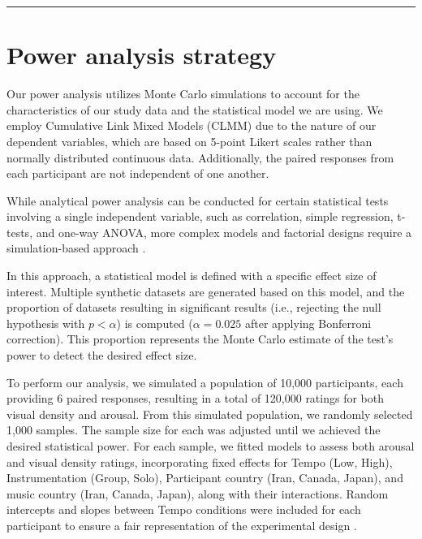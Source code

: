 \documentclass[
  bookmarksnumbered]{article}
\begin{document}
\begin{center}\rule{0.5\linewidth}{0.5pt}\end{center}

\hypertarget{power-analysis-strategy}{%
\section{Power analysis strategy}\label{power-analysis-strategy}}

Our power analysis utilizes Monte Carlo simulations to account for the characteristics of our study data and the statistical model we are using. We employ Cumulative Link Mixed Models (CLMM) due to the nature of our dependent variables, which are based on 5-point Likert scales rather than normally distributed continuous data. Additionally, the paired responses from each participant are not independent of one another.

While analytical power analysis can be conducted for certain statistical tests involving a single independent variable, such as correlation, simple regression, t-tests, and one-way ANOVA, more complex models and factorial designs require a simulation-based approach \autocite[e.g.,][]{lakensSimulationBasedPowerAnalysis2021}.

In this approach, a statistical model is defined with a specific effect size of interest. Multiple synthetic datasets are generated based on this model, and the proportion of datasets resulting in significant results (i.e., rejecting the null hypothesis with \(p < \alpha\)) is computed (\(\alpha = 0.025\) after applying Bonferroni correction). This proportion represents the Monte Carlo estimate of the test's power to detect the desired effect size.

To perform our analysis, we simulated a population of 10,000 participants, each providing 6 paired responses, resulting in a total of 120,000 ratings for both visual density and arousal. From this simulated population, we randomly selected 1,000 samples. The sample size for each was adjusted until we achieved the desired statistical power. For each sample, we fitted models to assess both arousal and visual density ratings, incorporating fixed effects for Tempo (Low, High), Instrumentation (Group, Solo), Participant country (Iran, Canada, Japan), and music country (Iran, Canada, Japan), along with their interactions. Random intercepts and slopes between Tempo conditions were included for each participant to ensure a fair representation of the experimental design \autocite{barrRandomEffectsStructure2013,debruineUnderstandingMixedEffectsModels2021}.
\end{document}

